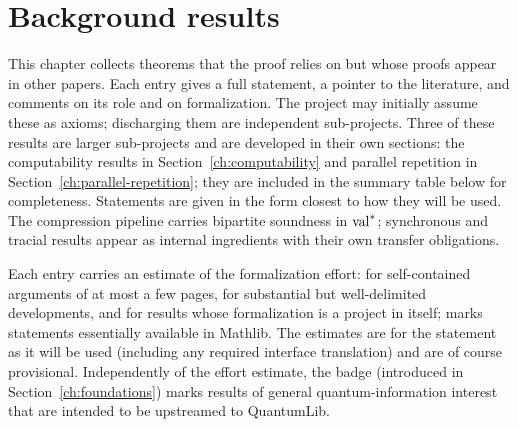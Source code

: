 \section{Background results}
\label{ch:required-results}

This chapter collects theorems that the proof relies on but whose proofs appear in
other papers. Each entry gives a full statement, a pointer to the literature, and
comments on its role and on formalization. The project may initially assume these as
axioms; discharging them are independent sub-projects. Three of these results are
larger sub-projects and are developed in their own sections: the computability
results in Section~\ref{ch:computability} and parallel repetition in
Section~\ref{ch:parallel-repetition}; they are included in the summary table below
for completeness. Statements are given in the form closest to how they will be used.
The compression pipeline carries bipartite soundness in $\mathrm{val}^*$; synchronous and
tracial results appear as internal ingredients with their own transfer obligations.

Each entry carries an estimate of the formalization effort:
\effortEasy{} for self-contained arguments of at most a few pages,
\effortMedium{} for substantial but well-delimited developments, and
\effortHard{} for results whose formalization is a project in itself;
\effortMathlib{} marks statements essentially available in Mathlib. The estimates
are for the statement as it will be used (including any required interface translation) and
are of course provisional. Independently of the effort estimate, the \qlib{} badge
(introduced in Section~\ref{ch:foundations}) marks results of general
quantum-information interest that are intended to be upstreamed to QuantumLib.

